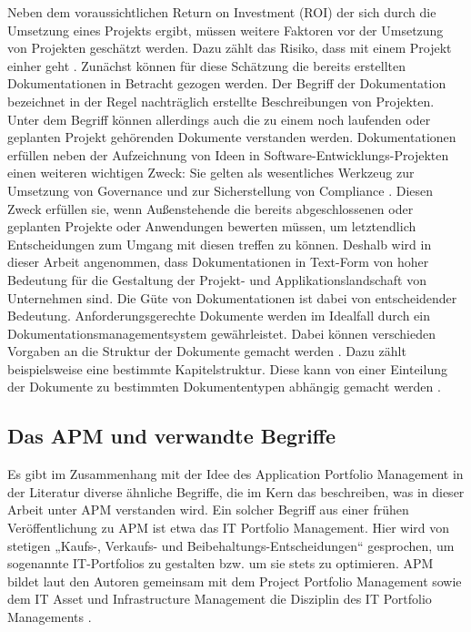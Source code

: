 Neben dem voraussichtlichen Return on Investment (ROI) der sich durch die Umsetzung eines Projekts ergibt, müssen weitere Faktoren vor der Umsetzung von Projekten geschätzt werden. Dazu zählt das Risiko, dass mit einem Projekt einher geht \cite[S. 120ff.]{gadatsch}. Zunächst können für diese Schätzung die bereits erstellten Dokumentationen in Betracht gezogen werden. Der Begriff der Dokumentation bezeichnet in der Regel nachträglich erstellte Beschreibungen von Projekten. Unter dem Begriff können allerdings auch die zu einem noch laufenden oder geplanten Projekt gehörenden Dokumente verstanden werden. Dokumentationen erfüllen neben der Aufzeichnung von Ideen in Software-Entwicklungs-Projekten einen weiteren wichtigen Zweck: Sie gelten als wesentliches Werkzeug zur Umsetzung von Governance und zur Sicherstellung von Compliance \cite[S. 2]{reiss}. Diesen Zweck erfüllen sie, wenn Außenstehende die bereits abgeschlossenen oder geplanten Projekte oder Anwendungen bewerten müssen, um letztendlich Entscheidungen zum Umgang mit diesen treffen zu können. Deshalb wird in dieser Arbeit angenommen, dass Dokumentationen in Text-Form von hoher Bedeutung für die Gestaltung der Projekt- und Applikationslandschaft von Unternehmen sind. Die Güte von Dokumentationen ist dabei von entscheidender Bedeutung. Anforderungsgerechte Dokumente werden im Idealfall durch ein Dokumentationsmanagementsystem gewährleistet. Dabei können verschieden Vorgaben an die Struktur der Dokumente gemacht werden \cite[S. 29]{reiss}. Dazu zählt beispielsweise eine bestimmte Kapitelstruktur. Diese kann von einer Einteilung der Dokumente zu bestimmten Dokumententypen abhängig gemacht werden \cite[S. 34-39]{reiss}.

\subsection {Das APM und verwandte Begriffe}
Es gibt im Zusammenhang mit der Idee des Application Portfolio Management in der Literatur diverse ähnliche Begriffe, die im Kern das beschreiben, was in dieser Arbeit unter APM verstanden wird. Ein solcher Begriff aus einer frühen Veröffentlichung zu APM ist etwa das IT Portfolio Management. Hier wird von stetigen „Kaufs-, Verkaufs- und Beibehaltungs-Entscheidungen“ gesprochen, um sogenannte IT-Portfolios zu gestalten bzw. um sie stets zu optimieren. APM bildet laut den Autoren gemeinsam mit dem Project Portfolio Management sowie dem IT Asset und Infrastructure Management die Disziplin des IT Portfolio Managements \cite[S. 2-14]{Gliedman}.

